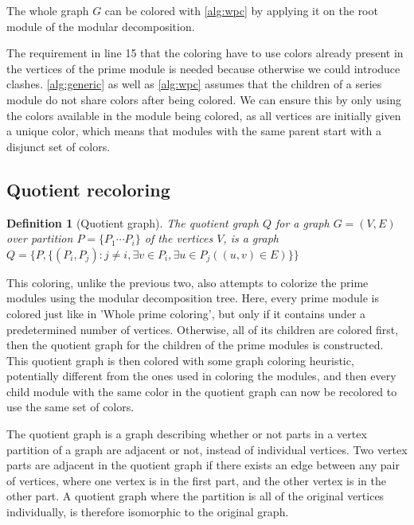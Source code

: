 \documentclass[a4paper]{article}
\newtheorem{definition}{Definition}[section]
\begin{document}
The whole graph $G$ can be colored with \autoref{alg:wpc} by applying it on the
root module of the modular decomposition.

The requirement in line 15 that the coloring have to use colors already present
in the vertices of the prime module is needed because otherwise we could
introduce clashes. \autoref{alg:generic} as well as \autoref{alg:wpc} assumes that the children of a series
module do not share colors after being colored. We can ensure this by only using the colors available
in the module being colored, as all vertices are initially given a unique color,
which means that modules with the same parent start with a disjunct set of
colors.

\subsection{Quotient recoloring}

\begin{definition}[Quotient graph]
    The quotient graph $Q$ for a graph $G = (V,E)$ over partition 
    $P = \{P_1 \cdots P_i\}$  of the vertices $V$, is a graph 
    $Q = \{P, \{(P_i,P_j) : j\neq i, \exists v \in P_i,\exists u \in P_j( (u,v)
    \in E)   \} \}  $
\end{definition}

This coloring, unlike the previous two, also attempts to colorize the prime
modules using the modular decomposition tree. Here, every prime module is
colored just like in 'Whole prime coloring', but only if it contains under a
predetermined number of vertices.  Otherwise, all of its children are colored
first, then the quotient graph for the children of the prime modules is
constructed. This quotient graph is then colored with some graph coloring
heuristic, potentially different from the ones used in coloring the modules,
and then every child module with the same color in the quotient graph can now
be recolored to use the same set of colors.

The quotient graph is a graph describing whether or not parts in a vertex partition of a
graph are adjacent or not, instead of individual vertices. Two vertex
parts are adjacent in the quotient graph if there exists an edge between
any pair of vertices, where one vertex is in the first part, and the other
vertex is in the other part. A quotient graph where the partition is all of
the original vertices individually, is therefore isomorphic to the original
graph.
\end{document}
